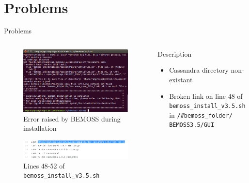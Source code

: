 \documentclass{beamer}
\begin{document}
\section{Problems}

\begin{frame}{Problems}
	\begin{columns}[T]
		\begin{column}{0.5\textwidth}
			\begin{figure}
				\includegraphics[scale=0.2]{figs/screenshot61019.png}
				\caption{Error raised by BEMOSS during installation}
			\end{figure}
			\begin{figure}
				\includegraphics[scale=0.4]{figs/datastaxURLError.png}
				\caption{Lines 48-52 of \texttt{bemoss\_install\_v3.5.sh}}
			\end{figure}
		\end{column}
		\begin{column}{0.5\textwidth}
			\begin{block}{Description}
				\begin{itemize}
					\item Cassandra directory non-existant
					\item Broken link on line 48 of \texttt{bemoss\_install\_v3.5.sh} in \texttt{/\#bemoss\_folder/
					BEMOSS3.5/GUI}
				\end{itemize}
			\end{block}
		\end{column}
	\end{columns}
\end{frame}
\end{document}
